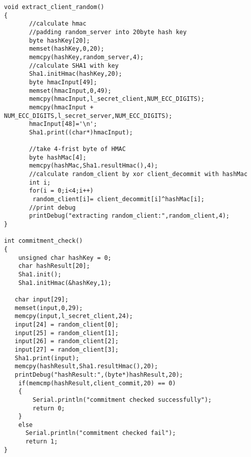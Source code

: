 {\begin{Verbatim}[fontsize=\small]
void extract_client_random()
{
       //calculate hmac 
       //padding random_server into 20byte hash key
       byte hashKey[20];
       memset(hashKey,0,20);
       memcpy(hashKey,random_server,4);
       //calculate SHA1 with key
       Sha1.initHmac(hashKey,20);
       byte hmacInput[49];
       memset(hmacInput,0,49);
       memcpy(hmacInput,l_secret_client,NUM_ECC_DIGITS);
       memcpy(hmacInput + NUM_ECC_DIGITS,l_secret_server,NUM_ECC_DIGITS);
       hmacInput[48]='\n';
       Sha1.print((char*)hmacInput);

       //take 4-frist byte of HMAC
       byte hashMac[4];
       memcpy(hashMac,Sha1.resultHmac(),4);
       //calculate random_client by xor client_decommit with hashMac
       int i;
       for(i = 0;i<4;i++)
        random_client[i]= client_decommit[i]^hashMac[i]; 
       //print debug
       printDebug("extracting random_client:",random_client,4);
}

int commitment_check()
{
    unsigned char hashKey = 0;
    char hashResult[20];
    Sha1.init();
    Sha1.initHmac(&hashKey,1);
    
   char input[29];
   memset(input,0,29);
   memcpy(input,l_secret_client,24);
   input[24] = random_client[0];
   input[25] = random_client[1];
   input[26] = random_client[2];
   input[27] = random_client[3];
   Sha1.print(input);     
   memcpy(hashResult,Sha1.resultHmac(),20);
   printDebug("hashResult:",(byte*)hashResult,20);
    if(memcmp(hashResult,client_commit,20) == 0)
    {
        Serial.println("commitment checked successfully");
        return 0;
    }
    else
      Serial.println("commitment checked fail");
      return 1;
}
\end{Verbatim}
}